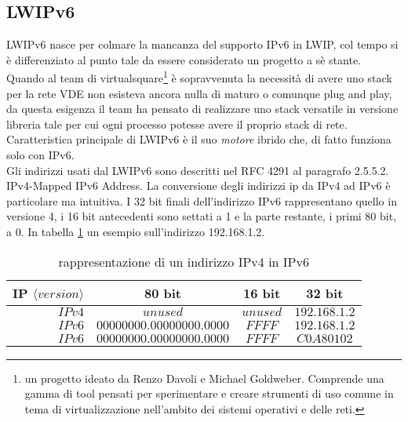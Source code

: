 \subsection{LWIPv6}
LWIPv6\cite{K6} nasce per colmare la mancanza del supporto IPv6 in LWIP, col tempo si \`e differenziato al punto tale da essere considerato un progetto a s\`e stante.\\
Quando al team di virtualsquare\footnote{un progetto ideato da Renzo Davoli e Michael Goldweber. Comprende una gamma di tool pensati per sperimentare e creare strumenti di uso comune in tema di virtualizzazione nell'ambito dei sistemi operativi e delle reti.}\cite{K15} \`e sopravvenuta la necessit\`a di avere uno stack per la rete VDE non esisteva ancora nulla di maturo o comunque plug and play, da questa esigenza il team ha pensato di realizzare uno stack versatile in versione libreria tale per cui ogni processo potesse avere il proprio stack di rete.\\
Caratteristica principale di LWIPv6 \`e il suo \textit{motore} ibrido che, di fatto funziona solo con IPv6. \\
Gli indirizzi usati dal LWIPv6 sono descritti nel RFC 4291\cite{K17} al paragrafo 2.5.5.2. IPv4-Mapped IPv6 Address.
La conversione degli indirizzi ip da IPv4 ad IPv6 \`e particolare ma intuitiva. I 32 bit finali dell'indirizzo IPv6 rappresentano quello in versione 4, i 16 bit antecedenti sono settati a 1 e la parte restante, i primi 80 bit, a 0. In tabella \ref{tab:IPv4toIPv6} un esempio sull'indirizzo 192.168.1.2.
\begin{table}[h]                        %
\begin{center}                          %
\begin{tabular}{r|c|c|c}                  %
\hline
IP $\langle version \rangle$ & 80 bit & 16 bit & 32 bit\\
\hline \hline                         %
$IPv4$ & $unused$  & $unused$  & $192.168.1.2$\\           %
\hline                                  %
$IPv6$ & $00000000.00000000.0000$ & $FFFF$ & $192.168.1.2$\\           %
\hline                                  %
$IPv6$ & $00000000.00000000.0000$ & $FFFF$ & $C0A80102$\\
\hline                           %
\end{tabular}
\caption[IPv4 to IPv6 conversion]{rappresentazione di un indirizzo IPv4 in IPv6}\label{tab:IPv4toIPv6}
\end{center}
\end{table}

